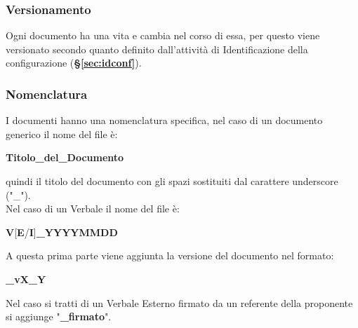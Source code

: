 \documentclass[a4paper,12pt]{article}
\begin{document}
        \subsubsection{Versionamento}
            Ogni documento ha una vita e cambia nel corso di essa, per questo viene versionato secondo quanto definito dall'attività di Identificazione della configurazione (\textbf{\S\ref{sec:idconf}}).

        \subsubsection{Nomenclatura}
            I documenti hanno una nomenclatura specifica, nel caso di un documento generico il nome del file è:
            \begin{center}
                \textbf{Titolo\_del\_Documento}
            \end{center}
            quindi il titolo del documento con gli spazi sostituiti dal carattere underscore ("\_").\\
            Nel caso di un Verbale il nome del file è:
            \begin{center}
                \textbf{V}[\textbf{E}/\textbf{I}]\textbf{\_YYYYMMDD}
            \end{center}
            A questa prima parte viene aggiunta la versione del documento nel formato:
            \begin{center}
                \textbf{\_vX\_Y}
            \end{center}
            Nel caso si tratti di un Verbale Esterno firmato da un referente della proponente si aggiunge "\textbf{\_firmato}".
        
\end{document}
